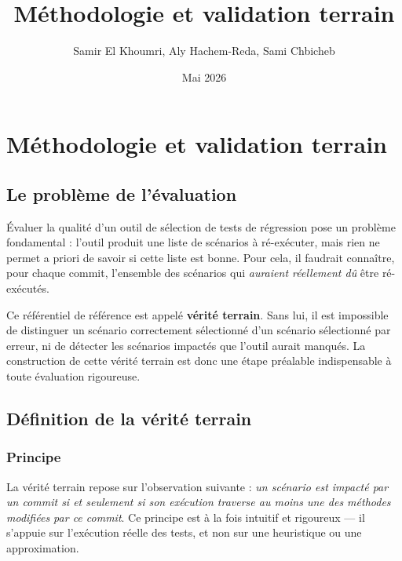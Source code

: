 \documentclass[12pt,a4paper]{article}
\title{\textbf{Méthodologie et validation terrain}}
\author{Samir El Khoumri, Aly Hachem-Reda, Sami Chbicheb}
\date{Mai 2026}
\begin{document}
\maketitle
\tableofcontents
\newpage

\section{Méthodologie et validation terrain}

\subsection{Le problème de l'évaluation}

Évaluer la qualité d'un outil de sélection de tests de régression pose
un problème fondamental : l'outil produit une liste de scénarios à
ré-exécuter, mais rien ne permet a priori de savoir si cette liste est
bonne. Pour cela, il faudrait connaître, pour chaque commit, l'ensemble
des scénarios qui \emph{auraient réellement dû} être ré-exécutés.

Ce référentiel de référence est appelé \textbf{vérité terrain}. Sans
lui, il est impossible de distinguer un scénario correctement sélectionné
d'un scénario sélectionné par erreur, ni de détecter les scénarios
impactés que l'outil aurait manqués. La construction de cette vérité
terrain est donc une étape préalable indispensable à toute évaluation
rigoureuse.

\subsection{Définition de la vérité terrain}

\subsubsection{Principe}

La vérité terrain repose sur l'observation suivante : \emph{un scénario
est impacté par un commit si et seulement si son exécution traverse au
moins une des méthodes modifiées par ce commit}. Ce principe est à la
fois intuitif et rigoureux --- il s'appuie sur l'exécution réelle des
tests, et non sur une heuristique ou une approximation.
\end{document}
